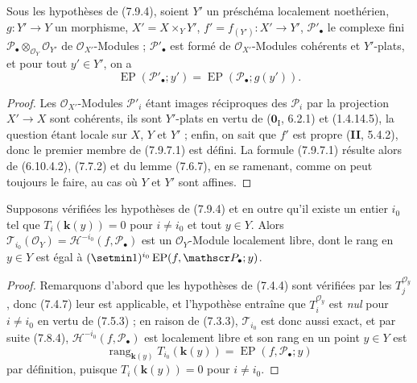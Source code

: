 \begin{proposition}[7.9.7]
\label{III.7.9.7.fr}
Sous les hypothèses de \textup{(7.9.4)}, soient $Y'$ un préschéma localement noethérien,
$g:Y'\to Y$ un morphisme, $X'=X\times_Y Y'$, $f'=f_{(Y')}:X'\to Y'$,
$\mathscr P'_\bullet$ le complexe fini
$\mathscr P_\bullet\otimes_{\mathscr O_Y}\mathscr O_{Y'}$
de $\mathscr O_{X'}$-Modules ; $\mathscr P'_\bullet$ est formé de
$\mathscr O_{X'}$-Modules cohérents et $Y'$-plats, et pour tout $y'\in Y'$, on a
\[
  \operatorname{EP}(\mathscr P'_\bullet;y')
  =\operatorname{EP}(\mathscr P_\bullet;g(y')).
  \tag{7.9.7.1}\label{III.7.9.7.1.fr}
\]
\end{proposition}

\begin{proof}
Les $\mathscr O_{X'}$-Modules $\mathscr P'_i$ étant images réciproques des
$\mathscr P_i$ par la projection $X'\to X$ sont cohérents, ils sont $Y'$-plats en
vertu de ($\mathbf{0}_{\mathrm I}$, 6.2.1) et (1.4.14.5), la question étant locale sur
$X$, $Y$ et $Y'$ ; enfin, on sait que $f'$ est propre (\textbf{II}, 5.4.2), donc le
premier membre de (7.9.7.1) est défini. La formule (7.9.7.1) résulte alors de
(6.10.4.2), (7.7.2) et du lemme (7.6.7), en se ramenant, comme on peut toujours
le faire, au cas où $Y$ et $Y'$ sont affines.
\end{proof}

\begin{proposition}[7.9.8]
\label{III.7.9.8.fr}
Supposons vérifiées les hypothèses de \textup{(7.9.4)} et en outre qu'il existe un entier
$i_0$ tel que $T_i(\boldsymbol{k}(y))=0$ pour $i\ne i_0$ et tout $y\in Y$.
Alors $\mathscr T_{i_0}(\mathscr O_Y)=\mathscr H^{-i_0}(f,\mathscr P_\bullet)$
est un $\mathscr O_Y$-Module localement libre, dont le rang en $y\in Y$ est égal
à $(\setmin 1)^{i_0}\operatorname{EP}(f,\mathscr P_\bullet;y)$.
\end{proposition}

\begin{proof}
Remarquons d'abord que les hypothèses de (7.4.4) sont vérifiées par les
$T_j^{\mathscr O_y}$, donc (7.4.7) leur est applicable, et l'hypothèse
entraîne que $T_i^{\mathscr O_y}$ est \emph{nul} pour $i\ne i_0$ en
vertu de (7.5.3) ; en raison de (7.3.3), $\mathscr T_{i_0}$ est donc aussi exact,
et par suite (7.8.4), $\mathscr H^{-i_0}(f,\mathscr P_\bullet)$ est localement
libre et son rang en un point $y\in Y$ est
\[
  \operatorname{rang}_{\mathbf{k}(y)}
  T_{i_0}(\boldsymbol{k}(y))
  =\operatorname{EP}(f,\mathscr P_\bullet;y)
\]
par définition, puisque $T_i(\boldsymbol{k}(y))=0$ pour $i\ne i_0$.
\end{proof}

